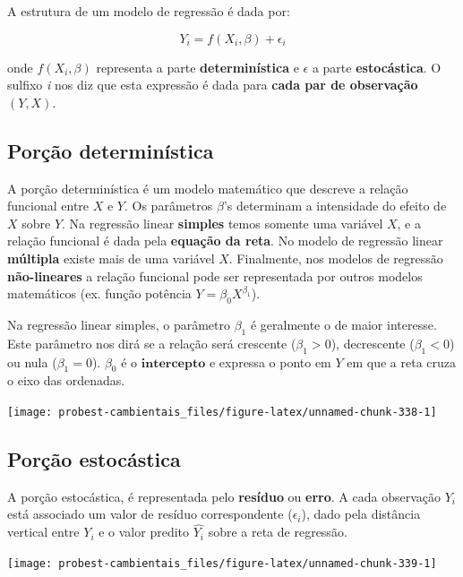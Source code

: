\documentclass[
]{book}
\begin{document}
A estrutura de um modelo de regressão é dada por:

\[Y_i = f(X_i, \beta) + \epsilon_i\]

onde \(f(X_i, \beta)\) representa a parte \textbf{determinística} e \(\epsilon\) a parte \textbf{estocástica}. O sulfixo \emph{i} nos diz que esta expressão é dada para \textbf{cada par de observação} \((Y,X)\).

\hypertarget{poruxe7uxe3o-determinuxedstica}{%
\subsection{Porção determinística}\label{poruxe7uxe3o-determinuxedstica}}

A porção determinística é um modelo matemático que descreve a relação funcional entre \(X\) e \(Y\). Os parâmetros \(\beta\)'s determinam a intensidade do efeito de \(X\) sobre \(Y\). Na regressão linear \textbf{simples} temos somente uma variável \(X\), e a relação funcional é dada pela \textbf{equação da reta}. No modelo de regressão linear \textbf{múltipla} existe mais de uma variável \(X\). Finalmente, nos modelos de regressão \textbf{não-lineares} a relação funcional pode ser representada por outros modelos matemáticos (ex. função potência \(Y = \beta_0X^{\beta_1}\)).

Na regressão linear simples, o parâmetro \(\beta_1\) é geralmente o de maior interesse. Este parâmetro nos dirá se a relação será crescente (\(\beta_1 > 0\)), decrescente (\(\beta_1 < 0\)) ou nula (\(\beta_1 = 0\)). \(\beta_0\) é o \(\textbf{intercepto}\) e expressa o ponto em \(Y\) em que a reta cruza o eixo das ordenadas.

\begin{center}\texttt{[image: probest-cambientais\_files/figure-latex/unnamed-chunk-338-1]} \end{center}

\hypertarget{poruxe7uxe3o-estocuxe1stica}{%
\subsection{Porção estocástica}\label{poruxe7uxe3o-estocuxe1stica}}

A porção estocástica, é representada pelo \textbf{resíduo} ou \textbf{erro}. A cada observação \(Y_i\) está associado um valor de resíduo correspondente (\(\epsilon_i\)), dado pela distância vertical entre \(Y_i\) e o valor predito \(\hat{Y_i}\) sobre a reta de regressão.

\begin{center}\texttt{[image: probest-cambientais\_files/figure-latex/unnamed-chunk-339-1]} \end{center}
\end{document}
